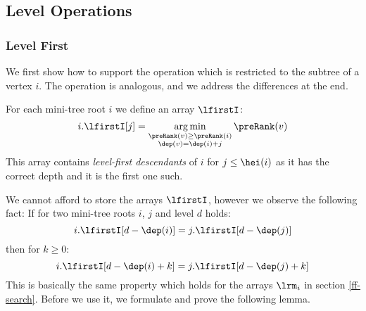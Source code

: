 \subsection{Level Operations}

\subsubsection{Level First}

We first show how to support the operation \levelFirst{} which is restricted to the subtree of a vertex $i$.
The operation \levelLast{} is analogous, and we address the differences at the end.

For each mini-tree root $i$ we define an array $\lfirstI$:
$$ i.\lfirstI[j] = \argmin_{\substack{\preRank(v) \ge \preRank(i) \\ \dep(v) = \dep(i) + j}} \preRank(v) $$
This array contains \emph{level-first descendants} of $i$ for $j \le \hei(i)$ as it has the correct depth and it is the first one such.

We cannot afford to store the arrays $\lfirstI$, however we observe the following fact:
If for two mini-tree roots $i$, $j$ and level $d$ holds:
$$i.\lfirstI[d - \dep(i)] = j.\lfirstI[d - \dep(j)]$$
then for $k \ge 0$:
$$i.\lfirstI[d - \dep(i) + k] = j.\lfirstI[d - \dep(j) + k]$$
This is basically the same property which holds for the arrays $\lrm_i$ in section \ref{ff-search}.
Before we use it, we formulate and prove the following lemma.

